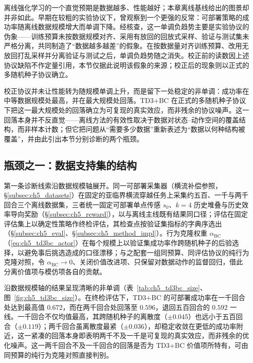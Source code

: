 离线强化学习的一个直觉预期是数据越多、性能越好；本章离线基线给出的图景却并非如此。早期在较粗的实验协议下，曾观察到一个更强的反常：可部署策略的成功率随离线数据规模增大而单调下降。经核查，这一单调负趋势主要是实验协议的伪象——训练预算未按数据规模对齐、采用有放回的回放式采样、验证与测试集未严格分离，共同制造了“数据越多越差”的假象。在按数据量对齐训练预算、改用无放回打乱采样并分离验证与测试之后，单调负趋势随之消失。校正前的读数因上述协议缺陷不作定量引用，本节仅据此说明该假象的来源；校正后的现象则以正式的多随机种子协议确立。

校正协议并未让性能转为随规模单调上升，而是留下一处稳定的非单调：成功率在中等数据规模处最高，并在最大规模处回落。TD3+BC 在正式的多随机种子协议下把这一最大规模处的回落确立为可复现的真实效应，而非残余的协议噪声。这一回落本身并不反直觉——离线方法的有效性取决于数据对状态–动作空间的覆盖结构，而非样本计数；但它把问题从“需要多少数据”重新表述为“数据以何种结构被覆盖”，并由此引出本节分别诊断的两个瓶颈。

\subsection{瓶颈之一：数据支持集的结构}\label{subsec:ch5_td3bc_support}

第一条诊断线索沿数据规模轴展开。同一可部署采集器（横流补偿参照，\S\ref{subsec:ch5_datasets}）在固定的亚临界横流穿越任务上采集约五百、一千与两千回合三个离线数据集，三者统一固定可部署单点传感 $s_0$、$k=4$ 历史堆叠与历史效率导向奖励（\S\ref{subsec:ch5_reward}），以与离线主线既有结果同口径；评估在固定评估集上以确定性策略作终检评估，其检查点按验证集指标的字典序选出（\S\ref{subsec:ch5_eval}、\S\ref{subsec:ch5_method_impl}）。行为克隆权重 $\alpha_{\mathrm{BC}}$（\eqref{eq:ch5_td3bc_actor}）在每个规模上以验证集成功率作跨随机种子的后验选择，以避免事后挑选造成的口径漂移；与之配套一组同预算、同评估协议的纯行为克隆对照，令 $\alpha_{\mathrm{BC}}\to 0$、关闭价值改进项、只保留对数据动作的监督回归，借此分离价值项与模仿项各自的贡献。

沿数据规模轴的结果呈现清晰的非单调（表~\ref{tab:ch5_td3bc_size}、图~\ref{fig:ch5_td3bc_size}）。在终检评估下，TD3+BC 的可部署成功率在一千回合处达到最高值 $0.672$，而在两千回合处回落至 $0.596$，退回五百回合的 $0.592$ 一线。一千回合不仅均值最高，其跨随机种子的离散度（$\pm 0.045$）也远小于五百回合（$\pm 0.119$）；两千回合虽离散度最紧（$\pm 0.036$），却稳定收敛在更低的成功率附近，这一紧凑的回落本身即表明两千不及一千是可复现的真实效应，而非残余的优化噪声。这一两千回合不及一千回合的回落是否为 TD3+BC 价值项所特有，可由同预算的纯行为克隆对照直接判别。

